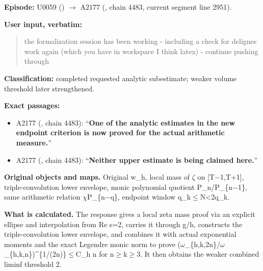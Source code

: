 \textbf{Episode:} U0059
(\protect{})
\allowbreak{}\ensuremath{→}\allowbreak{} A2177
(\protect{}, chain 4483,
current segment line 2951).

\textbf{User input, verbatim:}

\begin{quote}
the formalization session has been working - including a check for
delignes work again (which you have in workspace I think latex) -
continue pushing through
\end{quote}

\textbf{Classification:} completed requested analytic subestimate;
weaker volume threshold later strengthened.

\textbf{Exact passages:}

\begin{itemize}
\tightlist
\item
  A2177 (\protect{}, chain
  4483): ``\textbf{One of the analytic estimates in the new endpoint
  criterion is now proved for the actual arithmetic measure.}''
\item
  A2177 (\protect{}, chain
  4483): ``\textbf{Neither upper estimate is being claimed here.}''
\end{itemize}

\textbf{Original objects and maps.} Original w\_h, local mass of
\allowbreak{}\ensuremath{ζ}\allowbreak{} on
[T\allowbreak{}\ensuremath{−}\allowbreak{}1,T+1], triple-convolution
lower envelope, monic polynomial quotient
P\_n/P\_\{n\allowbreak{}\ensuremath{−}\allowbreak{}1\}, same arithmetic
relation
\allowbreak{}\ensuremath{χ}\allowbreak{}P\_\{n\allowbreak{}\ensuremath{−}\allowbreak{}q\},
endpoint window q\_k\allowbreak{}\ensuremath{≤}\allowbreak{}N<2q\_k.

\textbf{What is calculated.} The response gives a local zeta mass proof
via an explicit ellipse and interpolation from Re s=2, carries it
through g/h, constructs the triple-convolution lower envelope, and
combines it with actual exponential moments and the exact Legendre monic
norm to prove
(\allowbreak{}\ensuremath{ω}\allowbreak{}\_\{h,k,2n\}/\allowbreak{}\ensuremath{ω}\allowbreak{}\_\{h,k,n\})\textasciicircum{}\{1/(2n)\}\allowbreak{}\ensuremath{≤}\allowbreak{}C\_h
n for
n\allowbreak{}\ensuremath{≥}\allowbreak{}k\allowbreak{}\ensuremath{≥}\allowbreak{}3.
It then obtains the weaker combined liminf threshold 2.

